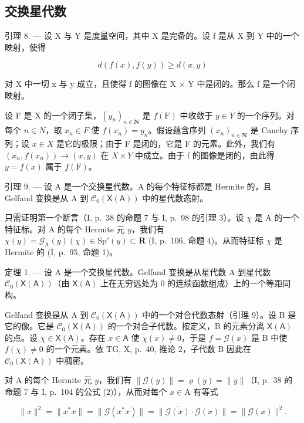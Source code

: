 \subsection{交换星代数}

引理 8. --- 设 X 与 Y 是度量空间，其中 X 是完备的。设 f 是从 X 到 Y 中的一个映射，使得

\[
d (f (x), f (y)) \geqslant d (x, y)
\]

对 X 中一切 x 与 y 成立，且使得 f 的图像在 X × Y 中是闭的。那么 f 是一个闭映射。

设 F 是 X 的一个闭子集，\((y_{n})_{n\in\mathbf{N}}\) 是 \(f(\mathrm{F})\) 中收敛于 \(y\in Y\) 的一个序列。对每个 \(n\in N\)，取 \(x_{n}\in F\) 使 \(f(x_{n})=y_{n}\)。假设蕴含序列 \((x_{n})_{n\in\mathbf{N}}\) 是 Cauchy 序列；设 \(x\in X\) 是它的极限；由于 F 是闭的，它是 F 的元素。此外，我们有 \((x_{n},f(x_{n}))\to(x,y)\) 在 \(X\times Y\) 中成立。由于 f 的图像是闭的，由此得 \(y=f(x)\) 属于 \(f(\mathrm{F})\)。

引理 9. --- 设 A 是一个交换星代数。A 的每个特征标都是 Hermite 的，且 Gelfand 变换是从 A 到 \(\mathcal{C}_{0}(\mathsf{X}(\mathsf{A}))\) 中的星代数态射。

只需证明第一个断言（I, p.~38 的命题 7 与 I, p.~98 的引理 3）。设 \(\chi\) 是 A 的一个特征标。对 A 的每个 Hermite 元 \(y\)，我们有 \(\chi(y) = \mathcal{G}_{\mathrm{A}}(y)(\chi) \in \mathrm{Sp}'(y) \subset \mathbf{R}\) (I, p.~106, 命题 4)。从而特征标 \(\chi\) 是 Hermite 的 (I, p.~95, 命题 1)。

定理 1. --- 设 A 是一个交换星代数。Gelfand 变换是从星代数 A 到星代数 \(\mathcal{C}_{0}(\mathsf{X}(\mathsf{A}))\)（由 \(\mathsf{X}(\mathsf{A})\) 上在无穷远处为 0 的连续函数组成）上的一个等距同构。

Gelfand 变换是从 A 到 \(\mathcal{C}_{0}(\mathsf{X}(\mathsf{A}))\) 中的一个对合代数态射（引理 9）。设 B 是它的像。它是 \(\mathcal{C}_{0}(\mathsf{X}(\mathsf{A}))\) 的一个对合子代数。按定义，B 的元素分离 \(\mathsf{X}(\mathsf{A})\) 的点。设 \(\chi \in \mathsf{X}(\mathsf{A})\)。存在 \(x \in \mathsf{A}\) 使 \(\chi(x) \neq 0\)，于是 \(f = \mathcal{G}(x)\) 是 B 中使 \(f(\chi) \neq 0\) 的一个元素。依 TG, X, p.~40, 推论 2，子代数 B 因此在 \(\mathcal{C}_{0}(\mathsf{X}(\mathsf{A}))\) 中稠密。

对 A 的每个 Hermite 元 \(y\)，我们有 \(\| \mathcal{G}(y)\| = \varrho (y) = \| y\|\)（I, p.~38 的命题 7 与 I, p.~104 的公式 (2)），从而对每个 \(x\in \mathrm{A}\) 有等式

\[
\| x \| ^ {2} = \| x ^ {*} x \| = \| \mathcal {G} (x ^ {*} x) \| = \| \overline {{\mathcal {G} (x)}} \cdot \mathcal {G} (x) \| = \| \mathcal {G} (x) \| ^ {2}.
\]

